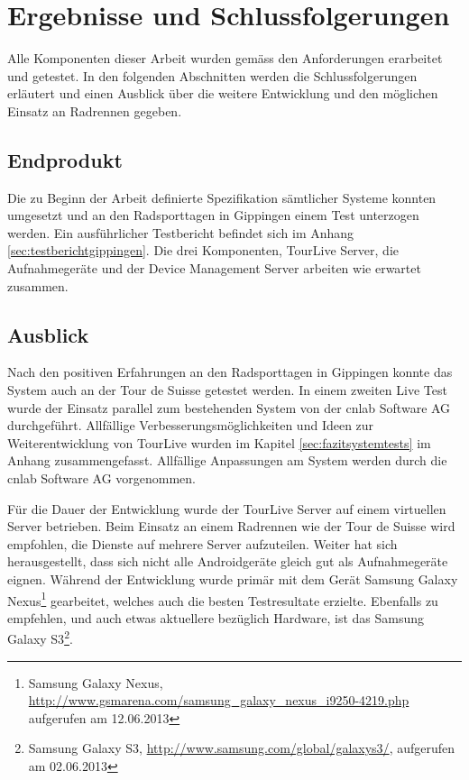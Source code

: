 \chapter{Ergebnisse und Schlussfolgerungen}

Alle Komponenten dieser Arbeit wurden gemäss den Anforderungen erarbeitet und getestet. In den folgenden Abschnitten werden die Schlussfolgerungen erläutert und einen Ausblick über die weitere Entwicklung und den möglichen Einsatz an Radrennen gegeben.

\section{Endprodukt}
Die zu Beginn der Arbeit definierte Spezifikation sämtlicher Systeme konnten umgesetzt  und an den Radsporttagen in Gippingen einem Test unterzogen werden. Ein ausführlicher Testbericht befindet sich im Anhang \ref{sec:testberichtgippingen}. Die drei Komponenten, TourLive Server, die Aufnahmegeräte und der Device Management Server arbeiten wie erwartet zusammen.

\section{Ausblick}
Nach den positiven Erfahrungen an den Radsporttagen in Gippingen konnte das System auch an der Tour de Suisse getestet werden. In einem zweiten Live Test wurde der Einsatz parallel zum bestehenden System von der cnlab Software AG durchgeführt. Allfällige Verbesserungsmöglichkeiten und Ideen zur Weiterentwicklung von TourLive wurden im Kapitel \ref{sec:fazitsystemtests} im Anhang zusammengefasst. Allfällige Anpassungen am System werden durch die cnlab Software AG vorgenommen.

Für die Dauer der Entwicklung wurde der TourLive Server auf einem virtuellen Server betrieben. Beim Einsatz an einem Radrennen wie der Tour de Suisse wird empfohlen,  die Dienste auf mehrere Server aufzuteilen. Weiter hat sich herausgestellt, dass sich nicht alle Androidgeräte gleich gut als Aufnahmegeräte eignen. Während der Entwicklung wurde primär mit dem Gerät Samsung Galaxy Nexus\footnote{Samsung Galaxy Nexus, \url{http://www.gsmarena.com/samsung_galaxy_nexus_i9250-4219.php} aufgerufen am 12.06.2013} gearbeitet, welches auch die besten Testresultate erzielte. Ebenfalls zu empfehlen, und auch etwas aktuellere bezüglich Hardware, ist das Samsung Galaxy S3\footnote{Samsung Galaxy S3, \url{http://www.samsung.com/global/galaxys3/}, aufgerufen am 02.06.2013}.
